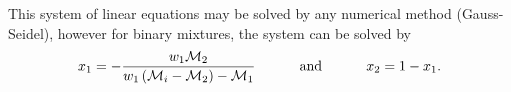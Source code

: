This system of linear equations may be solved by any numerical method (\eg Gauss-Seidel), however for binary mixtures, the system can be solved by
   \begin{displaymath}
      x_{1} = - \displaystyle\frac{w_{1}\mathcal{M}_{2}}{w_{1}\left(\mathcal{M}_{i}-\mathcal{M}_{2}\right)-\mathcal{M}_{1}}\hspace{1cm}\text{ and }\hspace{1cm} x_{2}=1-x_{1}.
   \end{displaymath}

